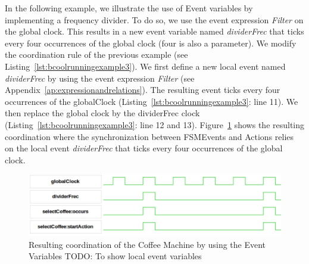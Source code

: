 In the following example, we illustrate the use of Event variables by implementing a frequency divider. To do so, we use the event expression \emph{Filter} on the global clock. This results in a new event variable named \emph{dividerFrec} that ticks every four occurrences of the global clock (four is also a parameter). We modify the coordination rule of the previous example (see Listing~\ref{lst:bcoolrunningexample3}). We first define a new local event named \emph{dividerFrec} by using the event expression \emph{Filter} (see Appendix~\ref{ap:expressionandrelations}). The resulting event ticks every four occurrences of the globalClock (Listing~\ref{lst:bcoolrunningexample3}: line 11). We then replace the global clock by the dividerFrec clock (Listing~\ref{lst:bcoolrunningexample3}: line 12 and 13). Figure~\ref{fig:runningeventvarfilter} shows the resulting coordination where the synchronization between FSMEvents and Actions relies on the local event \emph{dividerFrec} that ticks every four occurrences of the global clock.  
 
\begin{figure}[h]
 	\center
 	\includegraphics[width=.6\textwidth]{bcool/figs/runningeventvarfilter}
 	\caption{Resulting coordination of the Coffee Machine by using the Event Variables TODO: To show local event variables}
 	\label{fig:runningeventvarfilter}
\end{figure}


